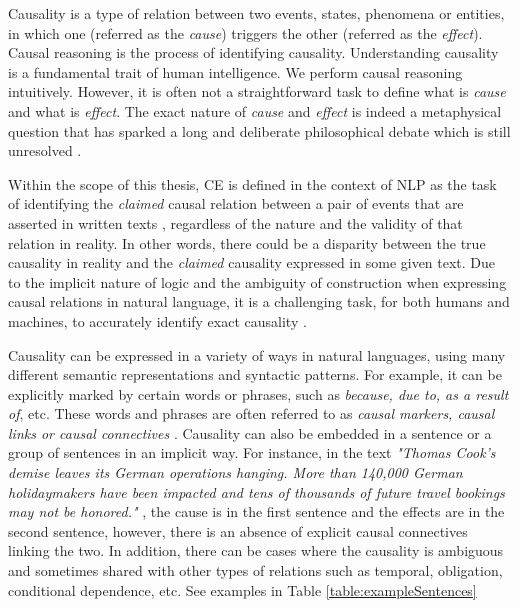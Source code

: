 Causality is a type of relation between two events, states, phenomena or entities, in which one (referred as the \emph{cause}) triggers the other (referred as the \emph{effect}). Causal reasoning is the process of identifying causality. Understanding causality is a fundamental trait of human intelligence. We perform causal reasoning intuitively. However, it is often not a straightforward task to define what is \emph{cause} and what is \emph{effect}. The exact nature of \emph{cause} and \emph{effect} is indeed a metaphysical question that has sparked a long and deliberate philosophical debate which is still unresolved \cite{Ali21Survey}. 

Within the scope of this thesis, CE is defined in the context of NLP as the task of identifying the \emph{claimed} causal relation between a pair of events that are asserted in written texts \cite{causenet2020}, regardless of the nature and the validity of that relation in reality. In other words, there could be a disparity between the true causality in reality and the \emph{claimed} causality expressed in some given text. Due to the implicit nature of logic and the ambiguity of construction when expressing causal relations in natural language, it is a challenging task, for both humans and machines, to accurately identify exact causality \cite{DunietzThesis18}.


Causality can be expressed in a variety of ways in natural languages, using many different semantic representations and syntactic patterns. For example, it can be explicitly marked by certain words or phrases, such as \emph{because, due to, as a result of}, etc.  These words and phrases are often referred to as \emph{causal markers, causal links or causal connectives} \cite{KhooThesis95}. Causality can also be embedded in a sentence or a group of sentences in an implicit way. For instance, in the text \emph{"Thomas Cook's demise leaves its German operations hanging. More than 140,000 German holidaymakers have been impacted and tens of thousands of future travel bookings may not be honored."} \cite{FinCausal20}, the cause is in the first sentence and the effects are in the second sentence, however, there is an absence of explicit causal connectives linking the two. In addition, there can be cases where the causality is ambiguous and sometimes shared with other types of relations such as temporal, obligation, conditional dependence, etc. See examples in Table \ref{table:exampleSentences}  

